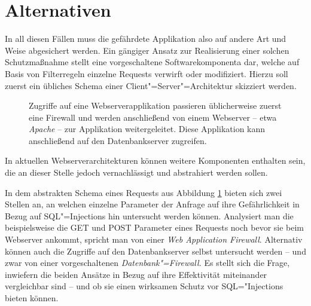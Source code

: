 \section{Alternativen}
In all diesen Fällen muss die gefährdete Applikation also auf andere Art und Weise abgesichert werden. Ein gängiger Ansatz zur Realisierung einer solchen Schutzmaßnahme stellt eine vorgeschaltene Softwarekomponenta dar, welche auf Basis von Filterregeln einzelne Requests verwirft oder modifiziert. Hierzu soll zuerst ein übliches Schema einer Client"=Server"=Architektur skizziert werden.

\begin{figure}[ht!]
\begin{margincap}
\centering
{}

\caption{Zugriffe auf eine Webserverapplikation passieren üblicherweise zuerst eine Firewall und werden anschließend von einem Webserver -- etwa \emph{Apache} -- zur Applikation weitergeleitet. Diese Applikation kann anschließend auf den Datenbankserver zugreifen.}
\label{img:server_arch}
\end{margincap}
\end{figure}


In aktuellen Webserverarchitekturen können weitere Komponenten enthalten sein, die an dieser Stelle jedoch vernachlässigt und abstrahiert werden sollen.

In dem abstrakten Schema eines Requests aus Abbildung \ref{img:server_arch} bieten sich zwei Stellen an, an welchen einzelne Parameter der Anfrage auf ihre Gefährlichkeit in Bezug auf SQL"=Injections hin untersucht werden können. Analysiert man die beispielsweise die GET und POST Parameter eines Requests noch bevor sie beim Webserver ankommt, spricht man von einer \emph{Web Application Firewall}. Alternativ können auch die Zugriffe auf den Datenbankserver selbst untersucht werden -- und zwar von einer vorgeschaltenen \emph{Datenbank"=Firewall.} Es stellt sich die Frage, inwiefern die beiden Ansätze in Bezug auf ihre Effektivität miteinander vergleichbar sind -- und ob sie einen wirksamen Schutz vor SQL="Injections bieten können.


